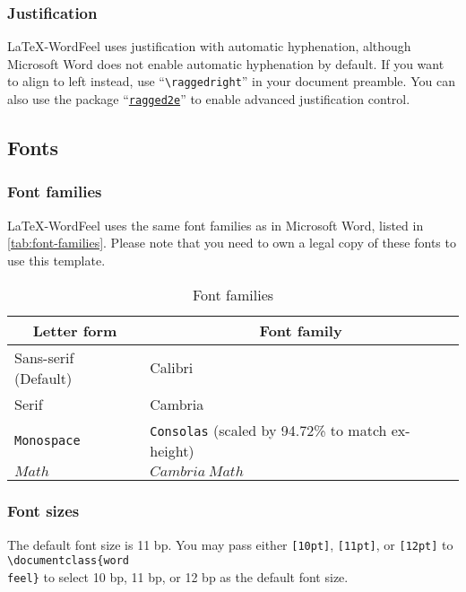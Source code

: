 \documentclass[letterpaper]{wordfeel}
\begin{document}
\subsubsection{Justification}

\LaTeX-WordFeel uses justification with automatic hyphenation, although Microsoft Word does not enable automatic hyphenation by default. If you want to align to left instead, use ``\texttt{\textbackslash{}raggedright}'' in your document preamble. You can also use the package ``\href{https://ctan.org/pkg/ragged2e}{\texttt{ragged2e}}'' to enable advanced justification control.

\subsection{Fonts}

\subsubsection{Font families}

\FloatBarrier

\LaTeX-WordFeel uses the same font families as in Microsoft Word, listed in \autoref{tab:font-families}. Please note that you need to own a legal copy of these fonts to use this template.

\begin{table}[htb]
    \centering
    \caption{Font families}
    \label{tab:font-families}
    \begin{tabular}{ll}
        \toprule
        \multicolumn{1}{c}{Letter form} & \multicolumn{1}{c}{Font family} \\
        \midrule
        \textsf{Sans-serif (Default)} & \textsf{Calibri} \\
        \textrm{Serif} & \textrm{Cambria} \\
        \texttt{Monospace} & \texttt{Consolas} (scaled by 94.72\% to match ex-height) \\
        \(Math\) & \(Cambria\ Math\) \\
        \bottomrule
    \end{tabular}
\end{table}

\FloatBarrier

\subsubsection{Font sizes}

The default font size is 11 bp. You may pass either \texttt{[10pt]}, \texttt{[11pt]}, or \texttt{[12pt]} to \texttt{\textbackslash{}documentclass\{word\\feel\}} to select 10 bp, 11 bp, or 12 bp as the default font size.
\end{document}
